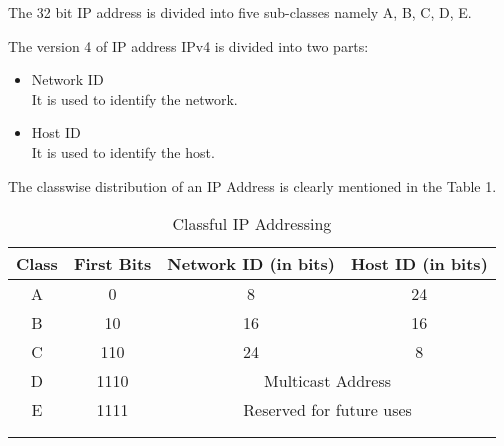 \documentclass[12pt]{article}
\begin{document}
The 32 bit IP address is divided into five sub-classes namely A, B, C, D, E.

The version 4 of IP address IPv4 is divided into two parts:
\begin{itemize}
    \item Network ID \\
        It is used to identify the network.
    \item Host ID \\
        It is used to identify the host.
\end{itemize}

The classwise distribution of an IP Address is clearly mentioned in the Table 1.
\begin{table}[]
\begin{center}
\begin{tabular}{cccc}
\hline
\multicolumn{1}{|c|}{\textbf{Class}} & \multicolumn{1}{c|}{\textbf{First Bits}} & \multicolumn{1}{c|}{\textbf{Network ID (in bits)}} & \multicolumn{1}{c|}{\textbf{Host ID (in bits)}} \\ \hline
\multicolumn{1}{|c|}{A}              & \multicolumn{1}{c|}{0}                   & \multicolumn{1}{c|}{8}                             & \multicolumn{1}{c|}{24}                         \\ \hline
\multicolumn{1}{|c|}{B}              & \multicolumn{1}{c|}{10}                  & \multicolumn{1}{c|}{16}                            & \multicolumn{1}{c|}{16}                          \\ \hline
\multicolumn{1}{|c|}{C}              & \multicolumn{1}{c|}{110}                 & \multicolumn{1}{c|}{24}                            & \multicolumn{1}{c|}{8}                          \\ \hline
\multicolumn{1}{|c|}{D}              & \multicolumn{1}{c|}{1110}                & \multicolumn{2}{c|}{Multicast Address}                                                               \\ \hline
\multicolumn{1}{|c|}{E}              & \multicolumn{1}{c|}{1111}                & \multicolumn{2}{c|}{Reserved for future uses}                                                        \\ \hline
\multicolumn{1}{l}{}                 & \multicolumn{1}{l}{}                     & \multicolumn{1}{l}{}                               & \multicolumn{1}{l}{}                            \\
\multicolumn{1}{l}{}                 & \multicolumn{1}{l}{}                     & \multicolumn{1}{l}{}                               & \multicolumn{1}{l}{}                           
\end{tabular}
\caption{Classful IP Addressing}
\end{center}
\end{table} \\
\end{document}
